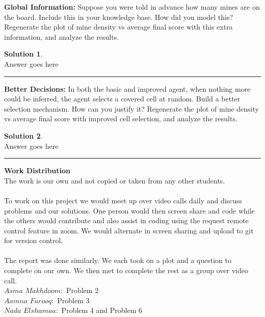 \documentclass{article}
\theoremstyle{definition}
\def\fline{\rule{0.75\linewidth}{0.5pt}}
\newcommand{\finishline}{\vspace{-15pt}\begin{center}\fline\end{center}}
\newtheorem*{solution*}{Solution}
\newenvironment{solution}{\begin{solution*}}{{\finishline} \end{solution*}}
\begin{document}
\smallskip

\textbf{Global Information: }
	Suppose you were told in advance how many mines are on the board. Include this in your knowledge base. How did you model this? Regenerate the plot of mine density vs average final score with this extra information, and analyze the results.

\smallskip

\begin{solution} \hfill \\
	Answer goes here
\end{solution}

\smallskip

\textbf{Better Decisions: }
	In both the basic and improved agent, when nothing more could be inferred, the agent selects a covered cell at random. Build a better selection mechanism. How can you justify it? Regenerate the plot of mine density vs average final score with improved cell selection, and analyze the results.
\begin{solution} \hfill \\
    Answer goes here
\end{solution}

\textbf{Work Distribution}
\\
The work is our own and not copied or taken from any other students. 
\\\\
To work on this project we would meet up over video calls daily and discuss problems and our solutions. One person would then screen share and code while the others would contribute and also assist in coding using the request remote control feature in zoom. We would alternate in screen sharing and upload to git for version control. 
\\\\
The report was done similarly. We each took on a plot and a question to complete on our own. We then met to complete the rest as a group over video call. 
\\
$Asma$ $Makhdoom:$ Problem 2
\\
$Aamna$ $Farooq:$ Problem 3
\\
$Nada$ $Elshamaa:$ Problem 4 and Problem 6
\\
\smallskip
\end{document}
